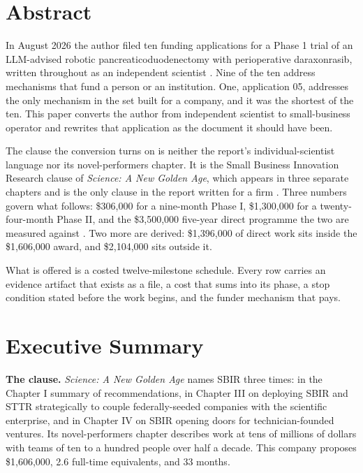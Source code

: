 \section*{Abstract}

In August 2026 the author filed ten funding applications for a Phase 1 trial of
an LLM-advised robotic pancreaticoduodenectomy with perioperative daraxonrasib,
written throughout as an independent scientist \cite{tenapps2026}. Nine of the
ten address mechanisms that fund a person or an institution. One, application
05, addresses the only mechanism in the set built for a company, and it was the
shortest of the ten. This paper converts the author from independent scientist
to small-business operator and rewrites that application as the document it
should have been.

The clause the conversion turns on is neither the report's individual-scientist
language nor its novel-performers chapter. It is the Small Business Innovation
Research clause of \emph{Science: A New Golden Age}, which appears in three
separate chapters and is the only clause in the report written for a firm
\cite{kratsios2026sciencegoldenage}. Three numbers govern what follows:
\$306,000 for a nine-month Phase I, \$1,300,000 for a twenty-four-month Phase
II, and the \$3,500,000 five-year direct programme the two are measured against
\cite{fundapp2}. Two more are derived: \$1,396,000 of direct work sits inside
the \$1,606,000 award, and \$2,104,000 sits outside it.

What is offered is a costed twelve-milestone schedule. Every row carries an
evidence artifact that exists as a file, a cost that sums into its phase, a stop
condition stated before the work begins, and the funder mechanism that pays.

\section*{Executive Summary}

\textbf{The clause.} \emph{Science: A New Golden Age} names SBIR three times: in
the Chapter I summary of recommendations, in Chapter III on deploying SBIR and
STTR strategically to couple federally-seeded companies with the scientific
enterprise, and in Chapter IV on SBIR opening doors for technician-founded
ventures. Its novel-performers chapter describes work at tens of millions of
dollars with teams of ten to a hundred people over half a decade. This company
proposes \$1,606,000, 2.6 full-time equivalents, and 33 months.

